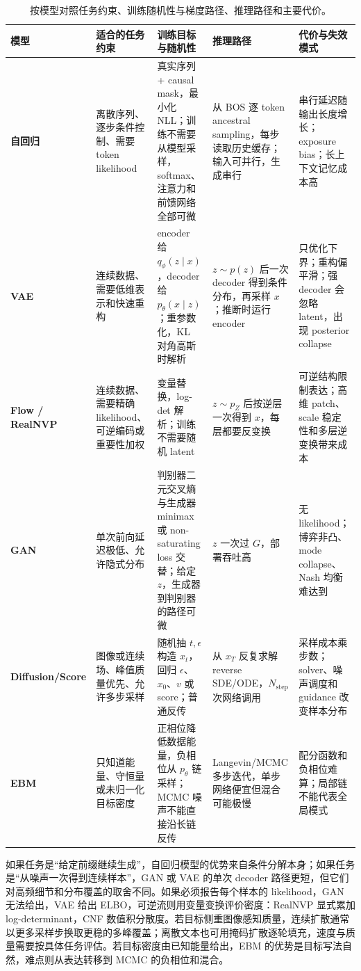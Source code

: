\begin{table}[ht]
\centering\scriptsize
\begin{tabularx}{\textwidth}{>{\bfseries}p{19mm} p{26mm} X X X}
\toprule
模型 & 适合的任务约束 & 训练目标与随机性 & 推理路径 & 代价与失效模式\\
\midrule
自回归 & 离散序列、逐步条件控制、需要 token likelihood
& 真实序列 + causal mask，最小化 NLL；训练不需要从模型采样，softmax、注意力和前馈网络全部可微
& 从 BOS 逐 token ancestral sampling，每步读取历史缓存；输入可并行，生成串行
& 串行延迟随输出长度增长；exposure bias；长上下文记忆成本高\\

VAE & 连续数据、需要低维表示和快速重构
& encoder 给 \(q_\phi(z\mid x)\)，decoder 给 \(p_\theta(x\mid z)\)；重参数化，KL 对角高斯时解析
& \(z\sim p(z)\) 后一次 decoder 得到条件分布，再采样 \(x\)；推断时运行 encoder
& 只优化下界；重构偏平滑；强 decoder 会忽略 latent，出现 posterior collapse\\

Flow / RealNVP & 连续数据、需要精确 likelihood、可逆编码或重要性加权
& 变量替换，log-det 解析；训练不需要随机 latent
& \(z\sim p_Z\) 后按逆层一次得到 \(x\)，每层都要反变换
& 可逆结构限制表达；高维 patch、scale 稳定性和多层逆变换带来成本\\

GAN & 单次前向延迟极低、允许隐式分布
& 判别器二元交叉熵与生成器 minimax 或 non-saturating loss 交替；给定 \(z\)，生成器到判别器的路径可微
& \(z\) 一次过 \(G\)，部署吞吐高
& 无 likelihood；博弈非凸、mode collapse、Nash 均衡难达到\\

Diffusion/\allowbreak Score & 图像或连续场、峰值质量优先、允许多步采样
& 随机抽 \(t,\epsilon\) 构造 \(x_t\)，回归 \(\epsilon\)、\(x_0\)、\(v\) 或 score；普通反传
& 从 \(x_T\) 反复求解 reverse SDE/ODE，\(N_{\mathrm{step}}\) 次网络调用
& 采样成本乘步数；solver、噪声调度和 guidance 改变样本分布\\

EBM & 只知道能量、守恒量或未归一化目标密度
& 正相位降低数据能量，负相位从 \(p_\theta\) 链采样；MCMC 噪声不能直接沿长链反传
& Langevin/MCMC 多步迭代，单步网络便宜但混合可能极慢
& 配分函数和负相位难算；局部链不能代表全局模式\\
\bottomrule
\end{tabularx}
\caption{按模型对照任务约束、训练随机性与梯度路径、推理路径和主要代价。}
\label{tab:model-selection-explicit}
\end{table}

如果任务是“给定前缀继续生成”，自回归模型的优势来自条件分解本身；如果任务是“从噪声一次得到连续样本”，GAN 或 VAE 的单次 decoder 路径更短，但它们对高频细节和分布覆盖的取舍不同。如果必须报告每个样本的 likelihood，GAN 无法给出，VAE 给出 ELBO，可逆流则用变量变换评价密度：RealNVP 显式累加 log-determinant，CNF 数值积分散度。若目标侧重图像感知质量，连续扩散通常以更多采样步换取更稳的多峰覆盖；离散文本也可用掩码扩散逐轮填充，速度与质量需要按具体任务评估。若目标密度由已知能量给出，EBM 的优势是目标写法自然，难点则从表达转移到 MCMC 的负相位和混合。

